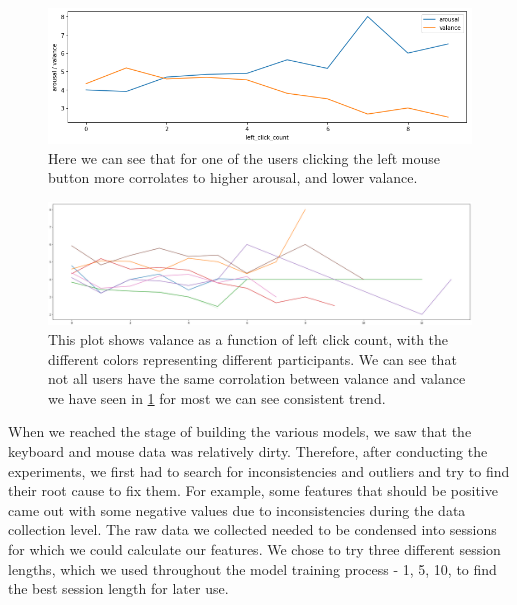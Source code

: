 \documentclass[../main.tex]{subfiles}
\begin{document}
    \begin{figure}[htp]
        \centering
        \includegraphics[width=\textwidth]{figures/left_click_single}   
        \caption{Here we can see that for one of the users clicking the left mouse button more corrolates to higher arousal, and lower valance.}
        \label{fig:left_click_single} 
    \end{figure}

    \begin{figure}[htp]
        \centering
        \includegraphics[width=\textwidth]{figures/left_click_multi}   
        \caption{This plot shows valance as a function of left click count, with the different colors representing different participants.
                 We can see that not all users have the same corrolation between valance and valance we have seen in \ref{fig:left_click_single} for most 
                 we can see consistent trend.}
        \label{fig:left_ckick_multi} 
    \end{figure}

    When we reached the stage of building the various models, we saw that the keyboard and mouse data was relatively dirty. 
    Therefore, after conducting the experiments, we first had to search for inconsistencies and outliers and try to find their root cause to fix them. 
    For example, some features that should be positive came out with some negative values due to inconsistencies during the data collection level.
    The raw data we collected needed to be condensed into sessions for which we could calculate our features. We chose to try three different session lengths, 
    which we used throughout the model training process - 1, 5, 10, to find the best session length for later use.
    
\end{document}
